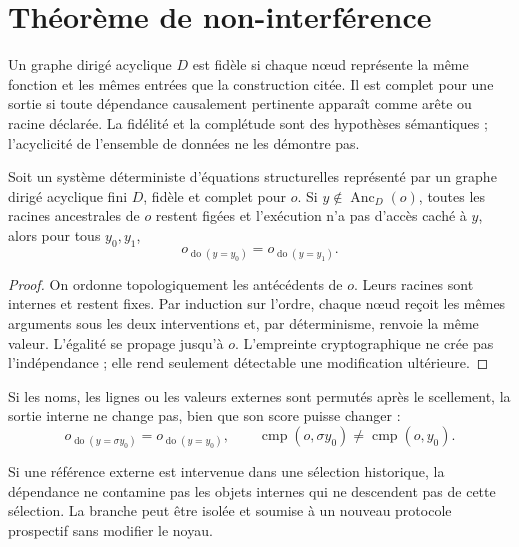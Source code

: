 \section{Théorème de non-interférence}
\label{sec:teorema-no-interferencia}

\begin{definition}
\label{def:dag-fiel-completo}
Un graphe dirigé acyclique \(D\) est fidèle si chaque nœud représente la même
fonction et les mêmes entrées que la construction citée. Il est complet pour
une sortie si toute dépendance causalement pertinente apparaît comme arête ou
racine déclarée. La fidélité et la complétude sont des hypothèses sémantiques ;
l'acyclicité de l'ensemble de données ne les démontre pas.
\end{definition}

\begin{theorem}
\label{thm:no-interferencia-prospectiva}
Soit un système déterministe d'équations structurelles représenté par un
graphe dirigé acyclique fini \(D\), fidèle et complet pour \(o\). Si
\(y\notin\operatorname{Anc}_D(o)\), toutes les racines ancestrales de \(o\)
restent figées et l'exécution n'a pas d'accès caché à \(y\), alors
pour tous \(y_0,y_1\),
\[
 o_{\operatorname{do}(y=y_0)}
 =o_{\operatorname{do}(y=y_1)}.
\]
\end{theorem}

\begin{proof}
On ordonne topologiquement les antécédents de \(o\). Leurs racines sont internes
et restent fixes. Par induction sur l'ordre, chaque nœud reçoit les mêmes
arguments sous les deux interventions et, par déterminisme, renvoie la même
valeur. L'égalité se propage jusqu'à \(o\). L'empreinte cryptographique ne crée pas
l'indépendance ; elle rend seulement détectable une modification ultérieure.
\end{proof}

\begin{corollary}
\label{cor:permutacion-comparacion-externa}
Si les noms, les lignes ou les valeurs externes sont permutés après le scellement, la
sortie interne ne change pas, bien que son score puisse changer :
\[
 o_{\operatorname{do}(y=\sigma y_0)}
 =o_{\operatorname{do}(y=y_0)},\qquad
 \operatorname{cmp}(o,\sigma y_0)
 \ne\operatorname{cmp}(o,y_0).
\]
\end{corollary}

\begin{proposition}
\label{prop:separacion-ramas-calibradas}
Si une référence externe est intervenue dans une sélection historique, la
dépendance ne contamine pas les objets internes qui ne descendent pas de cette
sélection. La branche peut être isolée et soumise à un nouveau protocole prospectif
sans modifier le noyau.
\end{proposition}

